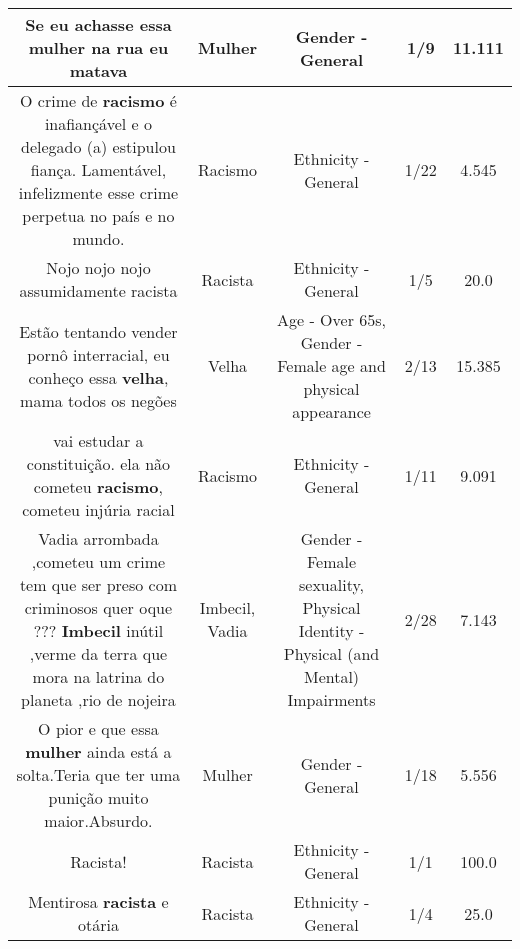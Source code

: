 \documentclass[11pt]{article}
\newlength\mylength
\begin{document}
\begin{center}
\begin{longtable}{|C{.65\mylength}|C{.30\mylength}|C{.12\mylength}|C{.12\mylength}|C{.12\mylength}|}
  \small Se eu achasse essa \textbf{mulher} na rua eu matava\normalsize   & Mulher & Gender - General & 1/9 & 11.111 \\  \hline
  \small O crime de \textbf{racismo} é inafiançável e o delegado (a) estipulou fiança. Lamentável, infelizmente esse crime perpetua no país e no mundo.\normalsize   & Racismo & Ethnicity - General & 1/22 & 4.545 \\  \hline
  \small Nojo nojo nojo assumidamente racista\normalsize   & Racista & Ethnicity - General & 1/5 & 20.0 \\  \hline
  \small Estão tentando vender pornô interracial, eu conheço essa \textbf{v\textbf{elha}}, mama todos os negões\normalsize   & Velha & Age - Over 65s, Gender - Female age and physical appearance & 2/13 & 15.385 \\  \hline
  \small vai estudar a constituição. ela não cometeu \textbf{racismo}, cometeu injúria racial\normalsize   & Racismo & Ethnicity - General & 1/11 & 9.091 \\  \hline
  \small Vadia arrombada ,cometeu um crime tem que ser preso com criminosos quer oque ??? \textbf{Imbecil} inútil ,verme da terra que mora na latrina do planeta ,rio de nojeira\normalsize   & Imbecil, Vadia & Gender - Female sexuality, Physical Identity - Physical (and Mental) Impairments & 2/28 & 7.143 \\  \hline
  \small O pior e que essa \textbf{mulher} ainda está a solta.Teria que ter uma punição muito maior.Absurdo.\normalsize   & Mulher & Gender - General & 1/18 & 5.556 \\  \hline
  \small Racista!\normalsize   & Racista & Ethnicity - General & 1/1 & 100.0 \\  \hline
  \small Mentirosa \textbf{racista} e otária\normalsize   & Racista & Ethnicity - General & 1/4 & 25.0 \\  \hline

\end{longtable}
\end{center}
\end{document}
